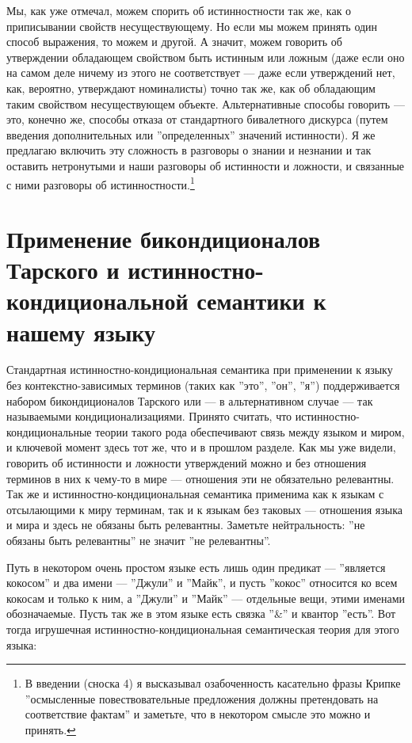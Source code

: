 \documentclass[11pt]{book}
\begin{document}
Мы, как уже отмечал, можем спорить об истинностности так же, как о приписывании свойств несуществующему. Но если мы можем принять один способ выражения, то можем и другой. А значит, можем говорить об утверждении обладающем свойством быть истинным или ложным (даже если оно на самом деле ничему из этого не соответствует --- даже если утверждений нет, как, вероятно, утверждают номиналисты) точно так же, как об обладающим таким свойством несуществующем объекте. Альтернативные способы говорить --- это, конечно же, способы отказа от стандартного бивалетного дискурса (путем введения дополнительных или ''определенных'' значений истинности). Я же предлагаю включить эту сложность в разговоры о знании и незнании и так оставить нетронутыми и наши разговоры об истинности и ложности, и связанные с ними разговоры об истинностности.\footnote{В введении (сноска 4) я высказывал озабоченность касательно фразы Крипке ''осмысленные повествовательные предложения должны претендовать на соответствие фактам'' и заметьте, что в некотором смысле это можно и принять.}

\section{Применение бикондиционалов Тарского и истинностно-кондициональной семантики к нашему языку}

Стандартная истинностно-кондициональная семантика при применении к языку без контекстно-зависимых терминов (таких как ''это'', ''он'', ''я'') поддерживается набором бикондиционалов Тарского или --- в альтернативном случае --- так называемыми кондиционализациями. Принято считать, что истинностно-кондициональные теории такого рода обеспечивают связь между языком и миром, и ключевой момент здесь тот же, что и в прошлом разделе. Как мы уже видели, говорить об истинности и ложности утверждений можно и без отношения терминов в них к чему-то в мире --- отношения эти не обязательно релевантны. Так же и истинностно-кондициональная семантика применима как к языкам с отсылающими к миру терминам, так и к языкам без таковых --- отношения языка и мира и здесь не обязаны быть релевантны. Заметьте нейтральность: ''не обязаны быть релевантны'' не значит ''не релевантны''.

Путь в некотором очень простом языке есть лишь один предикат --- ''является кокосом'' и два имени --- ''Джули'' и ''Майк'', и пусть ''кокос'' относится ко всем кокосам и только к ним, а ''Джули'' и ''Майк'' --- отдельные вещи, этими именами обозначаемые. Пусть так же в этом языке есть связка ''&'' и квантор ''есть''. Вот тогда игрушечная истинностно-кондициональная семантическая теория для этого языка:
\end{document}

